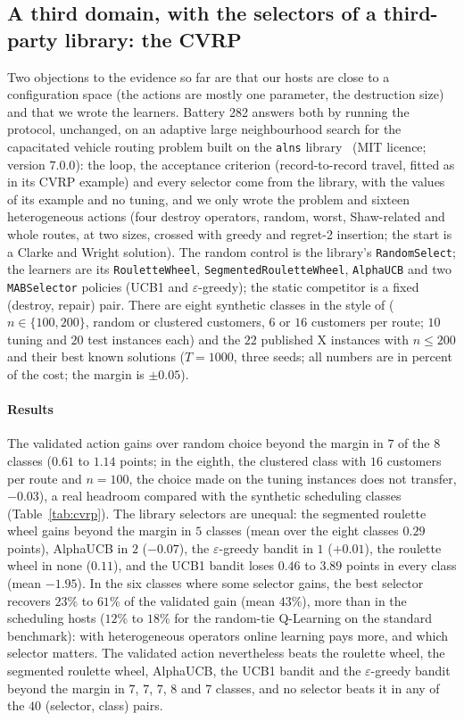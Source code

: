 \subsection{A third domain, with the selectors of a third-party library: the CVRP}
\label{sec:cvrp}
Two objections to the evidence so far are that our hosts are close to a configuration space (the actions are mostly one parameter, the destruction size) and that we wrote the learners. Battery 282 answers both by running the protocol, unchanged, on an adaptive large neighbourhood search for the capacitated vehicle routing problem built on the \texttt{alns} library~\citep{WoudaLan2023} (MIT licence; version $7.0.0$): the loop, the acceptance criterion (record-to-record travel, fitted as in its CVRP example) and every selector come from the library, with the values of its example and no tuning, and we only wrote the problem and sixteen heterogeneous actions (four destroy operators, random, worst, Shaw-related and whole routes, at two sizes, crossed with greedy and regret-2 insertion; the start is a Clarke and Wright solution). The random control is the library's \texttt{RandomSelect}; the learners are its \texttt{RouletteWheel}, \texttt{SegmentedRouletteWheel}, \texttt{AlphaUCB} and two \texttt{MABSelector} policies (UCB1 and $\varepsilon$-greedy); the static competitor is a fixed (destroy, repair) pair. There are eight synthetic classes in the style of \citet{UchoaEtal2017} ($n\in\{100,200\}$, random or clustered customers, $6$ or $16$ customers per route; $10$ tuning and $20$ test instances each) and the $22$ published X instances with $n\le200$ and their best known solutions ($T=1000$, three seeds; all numbers are in percent of the cost; the margin is $\pm0.05$).

\paragraph{Results} The validated action gains over random choice beyond the margin in $7$ of the $8$ classes ($0.61$ to $1.14$ points; in the eighth, the clustered class with $16$ customers per route and $n=100$, the choice made on the tuning instances does not transfer, $-0.03$), a real headroom compared with the synthetic scheduling classes (Table~\ref{tab:cvrp}). The library selectors are unequal: the segmented roulette wheel gains beyond the margin in $5$ classes (mean over the eight classes $0.29$ points), AlphaUCB in $2$ ($-0.07$), the $\varepsilon$-greedy bandit in $1$ ($+0.01$), the roulette wheel in none ($0.11$), and the UCB1 bandit loses $0.46$ to $3.89$ points in every class (mean $-1.95$). In the six classes where some selector gains, the best selector recovers $23\%$ to $61\%$ of the validated gain (mean $43\%$), more than in the scheduling hosts ($12\%$ to $18\%$ for the random-tie Q-Learning on the standard benchmark): with heterogeneous operators online learning pays more, and which selector matters. The validated action nevertheless beats the roulette wheel, the segmented roulette wheel, AlphaUCB, the UCB1 bandit and the $\varepsilon$-greedy bandit beyond the margin in $7$, $7$, $7$, $8$ and $7$ classes, and no selector beats it in any of the $40$ (selector, class) pairs.

